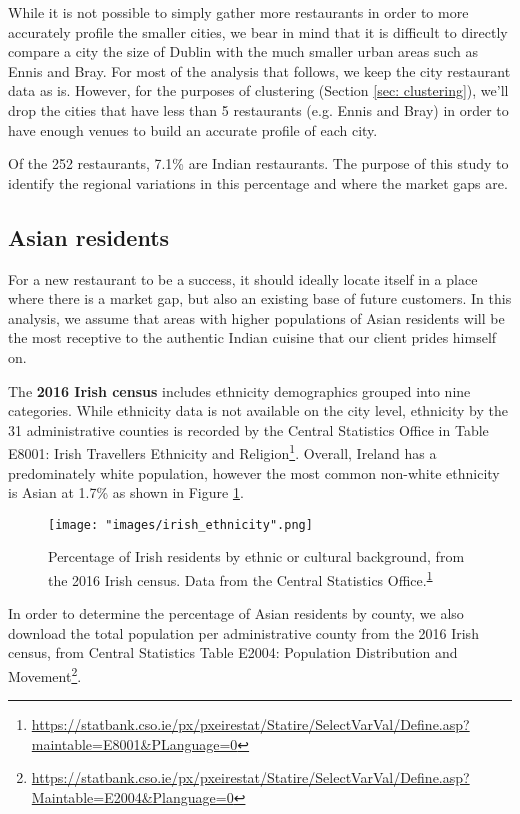 \documentclass[a4paper,11pt]{article}
\begin{document}
While it is not possible to simply gather more restaurants in order to more accurately profile the smaller cities, we bear in mind that it is difficult to directly compare a city the size of Dublin with the much smaller urban areas such as Ennis and Bray. For most of the analysis that follows, we keep the city restaurant data as is. However, for the purposes of clustering (Section \ref{sec: clustering}), we'll drop the cities that have less than 5 restaurants (e.g. Ennis and Bray) in order to have enough venues to build an accurate profile of each city.

Of the 252 restaurants, 7.1\% are Indian restaurants. The purpose of this study to identify the regional variations in this percentage and where the market gaps are.

\subsection{Asian residents}

For a new restaurant to be a success, it should ideally locate itself in a place where there is a market gap, but also an existing base of future customers. In this analysis, we assume that areas with higher populations of Asian residents will be the most receptive to the authentic Indian cuisine that our client prides himself on. 

The \textbf{2016 Irish census} includes ethnicity demographics grouped into nine categories. While ethnicity data is not available on the city level, ethnicity by the 31 administrative counties is recorded by the Central Statistics Office in Table E8001: Irish Travellers Ethnicity and Religion\footnote{\url{https://statbank.cso.ie/px/pxeirestat/Statire/SelectVarVal/Define.asp?maintable=E8001&PLanguage=0}\label{footnote:irish ethnicity}}. Overall, Ireland has a predominately white population, however the most common non-white ethnicity is Asian at 1.7\% as shown in Figure \ref{fig:irish ethnicity}. 

\begin{figure}[htb]
   \centering
   \texttt{[image: "images/irish\_ethnicity".png]}
      \caption{Percentage of Irish residents by ethnic or cultural background, from the 2016 Irish census. Data from the Central Statistics Office.\textsuperscript{\ref{footnote:irish ethnicity}}}
      \label{fig:irish ethnicity}
\end{figure}

In order to determine the percentage of Asian residents by county, we also download the total population per administrative county from the 2016 Irish census, from Central Statistics Table E2004: Population Distribution and Movement\footnote{\url{https://statbank.cso.ie/px/pxeirestat/Statire/SelectVarVal/Define.asp?Maintable=E2004&Planguage=0}}.
\end{document}
